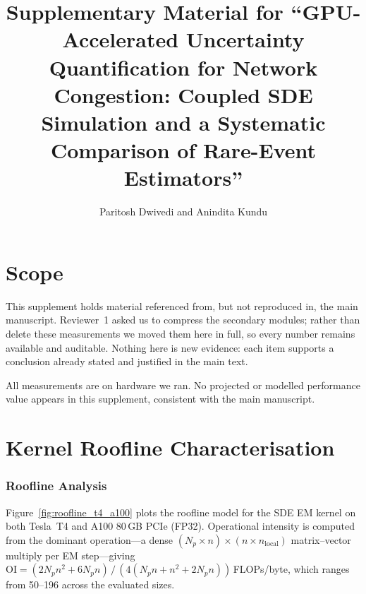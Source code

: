 \documentclass[10pt,twocolumn]{article}
\begin{document}
\title{Supplementary Material for ``GPU-Accelerated Uncertainty Quantification for
Network Congestion: Coupled SDE Simulation and a Systematic Comparison of
Rare-Event Estimators''}
\author{Paritosh Dwivedi and Anindita Kundu}
\date{}
\twocolumn[\begin{@twocolumnfalse}\maketitle\vspace{6mm}\end{@twocolumnfalse}]

\section*{Scope}

This supplement holds material referenced from, but not reproduced in, the main
manuscript. Reviewer~1 asked us to compress the secondary modules; rather than
delete these measurements we moved them here in full, so every number remains
available and auditable. Nothing here is new evidence: each item supports a
conclusion already stated and justified in the main text.

All measurements are on hardware we ran. No projected or modelled performance
value appears in this supplement, consistent with the main manuscript.

\section{Kernel Roofline Characterisation}

\subsubsection{Roofline Analysis}
\label{subsec:roofline}

Figure~\ref{fig:roofline_t4_a100} plots the roofline model for the SDE EM kernel on both
Tesla~T4 and A100 80\,GB PCIe (FP32).  Operational intensity is computed from the dominant
operation---a dense $(N_p{\times}n)\times(n{\times}n_{\mathrm{local}})$ matrix--vector
multiply per EM step---giving
$\mathrm{OI}=(2N_pn^2+6N_pn)\,/\,(4(N_pn+n^2+2N_pn))$\,FLOPs/byte,
which ranges from 50--196 across the evaluated sizes.
\end{document}
